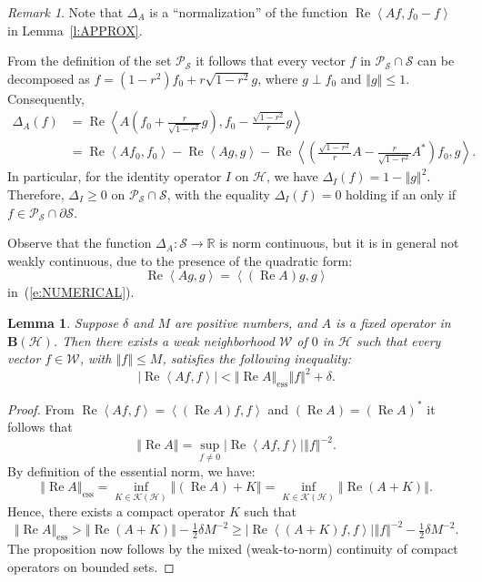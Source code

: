 \documentclass{tran-l}
\newtheorem{lem}[thm]{Lemma}
\theoremstyle{definition}
\theoremstyle{remark}
\newtheorem{rem}[thm]{Remark}
\numberwithin{equation}{subsection}
\DeclareMathOperator{\RE}{Re}
\DeclareMathOperator{\ess}{ess}
\newcommand{\To}{\longrightarrow}
\newcommand{\h}{\mathcal{H}}
\newcommand{\s}{\mathcal{S}}
\newcommand{\W}{\mathcal{W}}
\newcommand{\BH}{\mathbf{B}(\mathcal{H})}
\newcommand{\KH}{\mathcal{K}(\mathcal{H})}
\newcommand{\Real}{\mathbb{R}}
\newcommand{\Polar}{\mathcal{P}_{\s}}
\newcommand{\abs}[1]{\left\vert#1\right\vert}
\newcommand{\seq}[1]{\left<#1\right>}
\newcommand{\norm}[1]{\left\Vert#1\right\Vert}
\newcommand{\essnorm}[1]{\norm{#1}_{\ess}}
\begin{document}
\begin{rem}
Note that $\Delta_A$ is a ``normalization'' of the function $\RE\seq{A{f},f_0-f}$ in Lemma~\ref{l:APPROX}.

From the definition of the set $\Polar$ it follows that every vector $f$ in $\Polar\cap\s$ can be decomposed as $f=(1-r^2)f_0 + r\sqrt{1-r^2} g$, where $g \perp f_0$ and $\norm{g}\leq 1$. Consequently,
\begin{equation}\label{e:NUMERICAL}
\begin{split}
  \Delta_A(f) &=
  \RE\seq{A\left(f_0+\tfrac{r}{\sqrt{1-r^2}}g\right),
     f_0-\tfrac{\sqrt{1-r^2}}{r}g}\\ &=
  \RE\seq{A f_0, f_0} - \RE\seq{Ag, g} -
    \RE\seq{\left(\tfrac{\sqrt{1-r^2}}{r}A
    -\tfrac{r}{\sqrt{1-r^2}}A^*\right) f_0, g}.
\end{split}
\end{equation}
In particular, for the identity operator $I$ on $\h$, we have $\Delta_I(f)=1-\norm{g}^2$. Therefore, $\Delta_I\geq0$ on $\Polar\cap\s$, with the equality $\Delta_I(f)=0$ holding if an only if $f\in\Polar\cap\partial\s$.

Observe that the function $\Delta_A\colon\s\To\Real$ is norm continuous, but it is in general not weakly continuous, due to the presence of the quadratic form:
\[ \RE\seq{A g,g} = \seq{(\RE{A})g,g} \]
in~(\ref{e:NUMERICAL}).
\end{rem}

\begin{lem} \label{l:EssNR}
Suppose $\delta$ and $M$ are positive numbers, and $A$ is a fixed operator in $\BH$. Then there exists a weak neighborhood $\W$ of $0$ in $\h$ such that every vector $f\in\W$, with $\norm{f}\leq{M}$, satisfies the following inequality:
\[ \abs{\RE\seq{A{f},f}} < \essnorm{\RE{A}}\norm{f}^2 + \delta. \]
\end{lem}

\begin{proof}
From $\RE\seq{A f,f}=\seq{(\RE{A})f,f}$ and $(\RE{A})=(\RE{A})^*$ it follows that
\[ \norm{\RE{A}} = \sup_{f\neq0}
   \abs{\RE\seq{A f,f}}\norm{f}^{-2}. \]
By definition of the essential norm, we have:
\[ \essnorm{\RE A} = \inf_{K\in\KH} \norm{(\RE A)+K} =
   \inf_{K\in\KH} \norm{\RE(A+K)}. \]
Hence, there exists a compact operator $K$ such that
\[ \essnorm{\RE A} > \norm{\RE(A+K)}    - \tfrac{1}{2}\delta M^{-2} \geq
   \abs{\RE\seq{(A+K)f,f}}\norm{f}^{-2} - \tfrac{1}{2}\delta M^{-2} . \]
The proposition now follows by the mixed (weak-to-norm) continuity of compact operators on bounded sets.
\end{proof}
\end{document}
